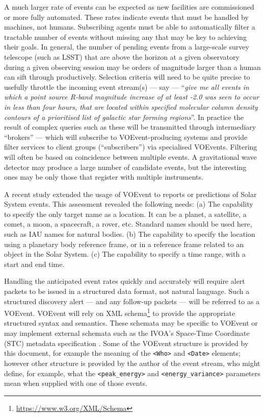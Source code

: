 \documentclass[11pt,a4paper]{ivoa}
\begin{document}
A much larger rate of events can be expected as new facilities are commissioned or more fully automated. These rates indicate events that must be handled by machines, not humans. Subscribing agents must be able to automatically filter a tractable number of events without missing any that may be key to achieving their goals. In general, the number of pending events from a large-scale survey telescope (such as LSST) that are above the horizon at a given observatory during a given observing session may be orders of magnitude larger than a human can sift through productively. Selection criteria will need to be quite precise to usefully throttle the incoming event stream(s) --- say --- ``\emph{give me all events in which a point source R-band magnitude increase of at least -2.0 was seen to occur in less than four hours, that are located within specified molecular column density contours of a prioritised list of galactic star forming regions}''. In practice the result of complex queries such as these will be transmitted through intermediary ``brokers'' --- which will subscribe to VOEvent-producing systems and provide filter services to client groups (``subscribers'') via specialised VOEvents. Filtering will often be based on coincidence between multiple events. A gravitational wave detector may produce a large number of candidate events, but the interesting ones may be only those that register with multiple instruments.

A recent study \citep{2018arXiv181112680C} extended the usage of VOEvent to reports or predictions of Solar System events. This assessment revealed the following needs: (a) The capability to specify the only target name as a location. It can be a planet, a satellite, a comet, a moon, a spacecraft, a rover, etc. Standard names should be used here, such as IAU names for natural bodies. (b) The capability to specify the location using a planetary body reference frame, or in a reference frame related to an object in the Solar System. (c) The capability to specify a time range, with a start and end time.

Handling the anticipated event rates quickly and accurately will require alert packets to be issued in a structured data format, not natural language. Such a structured discovery alert --- and any follow-up packets --- will be referred to as a VOEvent. VOEvent will rely on XML schema\footnote{\url{https://www.w3.org/XML/Schema}} to provide the appropriate structured syntax and semantics. These schemata may be specific to VOEvent or may implement external schemata such as the IVOA's Space-Time Coordinate (STC) metadata specification \citep{2007ivoa.spec.1030R}. Some of the VOEvent structure is provided by this document, for example the meaning of the {\tt <Who>} and {\tt <Date>} elements; however other structure is provided by the author of the event stream, who might define, for example, what the {\tt <peak\_energy>} and {\tt <energy\_variance>} parameters mean when supplied with one of those events. 
\end{document}
